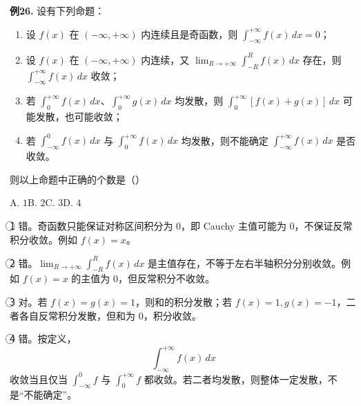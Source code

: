 \begin{problemblock}
\textbf{例26.} 设有下列命题：
\begin{enumerate}[label=\textcircled{\arabic*}, leftmargin=2.2em]
\item 设 \(f(x)\) 在 \((-\infty,+\infty)\) 内连续且是奇函数，则 \(\displaystyle\int_{-\infty}^{+\infty}f(x)\,dx=0\)；
\item 设 \(f(x)\) 在 \((-\infty,+\infty)\) 内连续，又 \(\displaystyle\lim_{R\to+\infty}\int_{-R}^{R}f(x)\,dx\) 存在，则 \(\displaystyle\int_{-\infty}^{+\infty}f(x)\,dx\) 收敛；
\item 若 \(\displaystyle\int_0^{+\infty}f(x)\,dx\)、\(\displaystyle\int_0^{+\infty}g(x)\,dx\) 均发散，则 \(\displaystyle\int_0^{+\infty}[f(x)+g(x)]\,dx\) 可能发散，也可能收敛；
\item 若 \(\displaystyle\int_{-\infty}^{0}f(x)\,dx\) 与 \(\displaystyle\int_{0}^{+\infty}f(x)\,dx\) 均发散，则不能确定 \(\displaystyle\int_{-\infty}^{+\infty}f(x)\,dx\) 是否收敛。
\end{enumerate}
则以上命题中正确的个数是（\quad）

A. \(1\)\qquad B. \(2\)\qquad C. \(3\)\qquad D. \(4\)
\end{problemblock}
\begin{solutionblock}
\textcircled{1} 错。奇函数只能保证对称区间积分为 \(0\)，即 Cauchy 主值可能为 \(0\)，不保证反常积分收敛。例如 \(f(x)=x\)。

\textcircled{2} 错。\(\lim_{R\to+\infty}\int_{-R}^{R}f(x)\,dx\) 是主值存在，不等于左右半轴积分分别收敛。例如 \(f(x)=x\) 的主值为 \(0\)，但反常积分不收敛。

\textcircled{3} 对。若 \(f(x)=g(x)=1\)，则和的积分发散；若 \(f(x)=1,g(x)=-1\)，二者各自反常积分发散，但和为 \(0\)，积分收敛。

\textcircled{4} 错。按定义，
\[
\int_{-\infty}^{+\infty}f(x)\,dx
\]
收敛当且仅当 \(\int_{-\infty}^0f\) 与 \(\int_0^{+\infty}f\) 都收敛。若二者均发散，则整体一定发散，不是“不能确定”。
\end{solutionblock}

